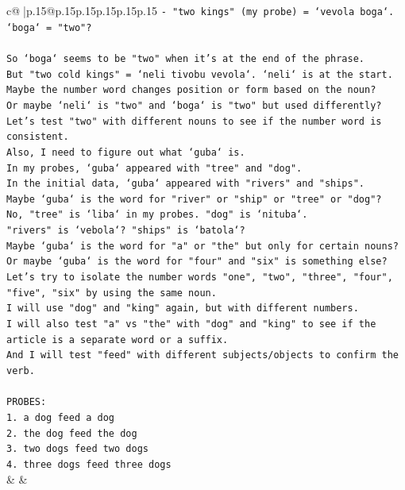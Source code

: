 \documentclass{article}
\begin{document}
{\begin{supertabular}{c@{$\;$}|p{.15\linewidth}@{}p{.15\linewidth}p{.15\linewidth}p{.15\linewidth}p{.15\linewidth}p{.15\linewidth}}
{{{\texttt{{-} "two kings" (my probe) = `vevola boga`. `boga` = "two"?} \\
\\ 
\texttt{So `boga` seems to be "two" when it's at the end of the phrase.} \\
\texttt{But "two cold kings" = `neli tivobu vevola`. `neli` is at the start.} \\
\texttt{Maybe the number word changes position or form based on the noun?} \\
\texttt{Or maybe `neli` is "two" and `boga` is "two" but used differently?} \\
\texttt{Let's test "two" with different nouns to see if the number word is consistent.} \\
\texttt{Also, I need to figure out what `guba` is.} \\
\texttt{In my probes, `guba` appeared with "tree" and "dog".} \\
\texttt{In the initial data, `guba` appeared with "rivers" and "ships".} \\
\texttt{Maybe `guba` is the word for "river" or "ship" or "tree" or "dog"?} \\
\texttt{No, "tree" is `liba` in my probes. "dog" is `nituba`.} \\
\texttt{"rivers" is `vebola`? "ships" is `batola`?} \\
\texttt{Maybe `guba` is the word for "a" or "the" but only for certain nouns?} \\
\texttt{Or maybe `guba` is the word for "four" and "six" is something else?} \\
\texttt{Let's try to isolate the number words "one", "two", "three", "four", "five", "six" by using the same noun.} \\
\texttt{I will use "dog" and "king" again, but with different numbers.} \\
\texttt{I will also test "a" vs "the" with "dog" and "king" to see if the article is a separate word or a suffix.} \\
\texttt{And I will test "feed" with different subjects/objects to confirm the verb.} \\
\\ 
\texttt{PROBES:} \\
\texttt{1. a dog feed a dog} \\
\texttt{2. the dog feed the dog} \\
\texttt{3. two dogs feed two dogs} \\
\texttt{4. three dogs feed three dogs} \\
            }
        }
    }
    & & \\ \\


\end{supertabular}}
\end{document}
